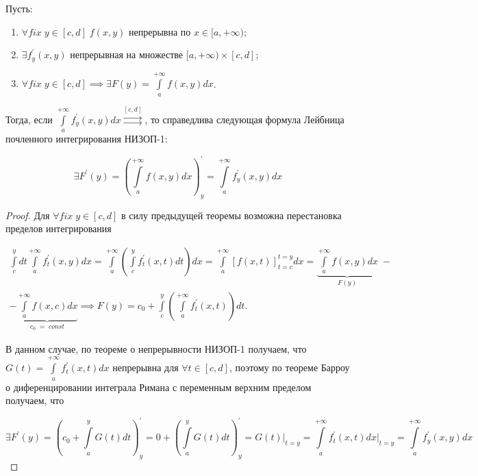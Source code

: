 \documentclass[../../main.tex]{subfiles}
\begin{document}
\begin{thm}
	Пусть: 
	\begin{enumerate}
		\item $\forall fix \; y \in [c, d] \; f(x, y)$ непрерывна по $x \in [a, +\infty)$;
		\item $\exists f^{'}_y (x, y)$ непрерывная на множестве $[a, +\infty) \times [c, d]$;
		\item $\forall fix \; y \in [c, d] \implies \exists F(y) = \int\limits_a^{+\infty} f(x, y) dx$.
	\end{enumerate}
	Тогда, если $\displaystyle \int\limits_a^{+\infty} f^{'}_y (x, y) dx \overset{[c, d]}{\rightrightarrows}$, то справедлива следующая формула Лейбница почленного интегрирования НИЗОП-1:
	
	\begin{equation} \label{lec11:1}
		\exists F^{'}(y) = \left( \int\limits_a^{+\infty} f(x, y) dx \right)^{'}_y = \int\limits_a^{+\infty} f^{'}_y (x, y) dx 
	\end{equation}
	
	\begin{proof}
		Для $\forall fix \; y \in [c, d]$ в силу предыдущей теоремы возможна перестановка пределов интегрирования
		
		\begin{equation*}
		\begin{gathered}
		\int\limits_c^y dt \int\limits_a^{+\infty} f^{'}_{t}(x, y) dx =
		\int\limits_a^{+\infty} \left( \int\limits_c^y f^{'}_{t} (x, t) dt \right) dx =
		\int\limits_a^{+\infty} \left[ f(x, t) \right]_{t = c}^{t = y} dx
		= \underbrace{\int\limits_a^{+\infty} f(x, y) dx}_{F(y)}\;- \\
		- \underbrace{\int\limits_a^{+\infty} f (x, c) dx}_{c_0\;=\;const} \implies 
		F(y) = c_0 + \int\limits_c^y \left( \int\limits_a^{+\infty} f^{'}_{t} (x, t) \right) dt.
		\end{gathered}
		\end{equation*}
		
		В данном случае, по теореме о непрерывности НИЗОП-1 получаем, что $G(t) = \int\limits_a^{+\infty} f_{t}^{'}(x, t) dx$ непрерывна для $\forall t \in [c, d]$, поэтому по теореме Барроу о диференцировании интеграла Римана с переменным верхним пределом получаем, что
		
		$$
		\exists F^{'}(y) = (c_0 + \int\limits_a^y G(t)dt)^{'}_y = 0 + (\int\limits_a^y G(t)dt)^{'}_y = G(t)\bigg|_{t = y} = \int\limits_a^{+\infty} f^{'}_t (x, t) dx\bigg|_{t = y} = \int\limits^{+\infty}_a  f^{'}_y (x, y) dx
		$$ 
	\end{proof}
	
\end{thm}
\end{document}
